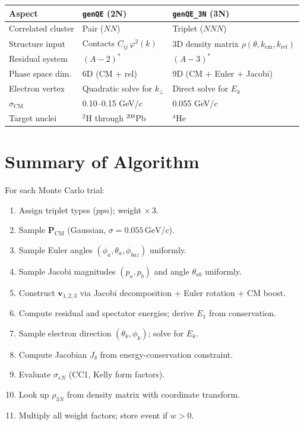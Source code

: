 \documentclass[11pt,a4paper]{article}
\newcommand{\vect}[1]{\bm{#1}}
\newcommand{\unit}[1]{\,\mathrm{#1}}
\newcommand{\GeV}{\unit{GeV}}
\begin{document}
\begin{center}
\begin{tabular}{lll}
\toprule
Aspect & \texttt{genQE} (2N) & \texttt{genQE\_3N} (3N) \\
\midrule
Correlated cluster & Pair ($N N$) & Triplet ($N N N$) \\
Structure input    & Contacts $C_{ij}\,\varphi^{2}(k)$ & 3D density matrix $\rho(\theta,k_{\text{cm}},k_{\text{rel}})$ \\
Residual system    & $(A{-}2)^{*}$ & $(A{-}3)^{*}$ \\
Phase space dim.   & 6D (CM + rel) & 9D (CM + Euler + Jacobi) \\
Electron vertex    & Quadratic solve for $k_{\perp}$ & Direct solve for $E_{k}$ \\
$\sigma_{\text{CM}}$ & 0.10--0.15 GeV/$c$ & 0.055 GeV/$c$ \\
Target nuclei      & $^{2}$H through $^{208}$Pb & $^{4}$He \\
\bottomrule
\end{tabular}
\end{center}

\section{Summary of Algorithm}

For each Monte Carlo trial:
\begin{enumerate}
  \item Assign triplet types ($ppn$); weight $\times\,3$.
  \item Sample $\vect{P}_{\text{CM}}$ (Gaussian, $\sigma = 0.055\GeV/c$).
  \item Sample Euler angles $(\phi_{a},\theta_{a},\phi_{baz})$ uniformly.
  \item Sample Jacobi magnitudes $(p_{a},p_{b})$ and angle $\theta_{ab}$
        uniformly.
  \item Construct $\vect{v}_{1,2,3}$ via Jacobi decomposition + Euler
        rotation + CM boost.
  \item Compute residual and spectator energies; derive $E_{1}$ from
        conservation.
  \item Sample electron direction $(\theta_{k},\phi_{k})$; solve for $E_{k}$.
  \item Compute Jacobian $J_{\delta}$ from energy-conservation constraint.
  \item Evaluate $\sigma_{eN}$ (CC1, Kelly form factors).
  \item Look up $\rho_{3N}$ from density matrix with coordinate transform.
  \item Multiply all weight factors; store event if $w > 0$.
\end{enumerate}
\end{document}
